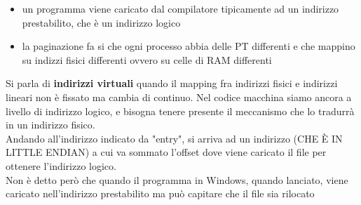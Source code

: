 \documentclass{article}
\begin{document}
\begin{itemize}
\item un programma viene caricato dal compilatore tipicamente ad un indirizzo prestabilito, che è un indirizzo logico
\item la paginazione fa si che ogni processo abbia delle PT differenti e che mappino su indizzi fisici differenti ovvero su celle di RAM differenti
\end{itemize}
Si parla di \textbf{indirizzi virtuali} quando il mapping fra indirizzi fisici e indirizzi lineari non è fissato ma cambia di continuo. Nel codice macchina siamo ancora a livello di indirizzo logico, e bisogna tenere presente il meccanismo che lo tradurrà in un indirizzo fisico.\\ Andando all'indirizzo indicato da "entry", si arriva ad un indirizzo (CHE È IN LITTLE ENDIAN) a cui va sommato l'offset dove viene caricato il file per ottenere l'indirizzo logico.\\ Non è detto però che quando il programma in Windows, quando lanciato, viene caricato nell'indirizzo prestabilito ma può capitare che il file sia rilocato
\end{document}
